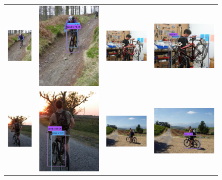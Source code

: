 \documentclass[10pt,twocolumn,letterpaper]{article}
\begin{document}
\begin{figure}[h]
\begin{tabular}{|cc|cc|}
  \includegraphics[width=0.15\linewidth]{supp/pas_bicycle7a.png} &
  \includegraphics[width=0.15\linewidth]{supp/pas_bicycle7b.png} & 
  \includegraphics[width=0.22\linewidth]{supp/pas_bicycle8a.png} &
  \includegraphics[width=0.22\linewidth]{supp/pas_bicycle8b.png}  \\
  \includegraphics[width=0.15\linewidth]{supp/pas_bicycle9a.png} &
  \includegraphics[width=0.15\linewidth]{supp/pas_bicycle9b.png} & 
  \includegraphics[width=0.22\linewidth]{supp/pas_bicycle10a.png} &
  \includegraphics[width=0.22\linewidth]{supp/pas_bicycle10b.png}  \\

\end{tabular}
\end{figure}
\end{document}
